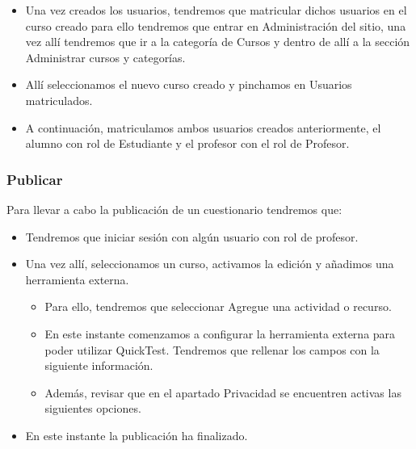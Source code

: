 \begin{itemize}
	\item Una vez creados los usuarios, tendremos que matricular dichos usuarios en el curso creado para ello tendremos que entrar en Administración del sitio, una vez allí tendremos que ir a la categoría de Cursos y dentro de allí a la sección Administrar cursos y categorías.
	
	\item Allí seleccionamos el nuevo curso creado y pinchamos en Usuarios matriculados.
	
	\item A continuación, matriculamos ambos usuarios creados anteriormente, el alumno con rol de Estudiante y el profesor con el rol de Profesor.
	
	

\end{itemize}

\subsubsection{Publicar}

Para llevar a cabo la publicación de un cuestionario tendremos que:

\begin{itemize}

	\item Tendremos que iniciar sesión con algún usuario con rol de profesor.
	
	\item Una vez allí, seleccionamos un curso, activamos la edición y añadimos una herramienta externa.
	
	\begin{itemize}
	
			\item Para ello, tendremos que seleccionar Agregue una actividad o recurso. 
			\item En este instante comenzamos a configurar la herramienta externa para poder utilizar QuickTest. Tendremos que rellenar los campos con la siguiente información. 
			
			\item Además, revisar que en el apartado Privacidad se encuentren activas las siguientes opciones. 
	
	\end{itemize}
	
	\item En este instante la publicación ha finalizado.

\end{itemize}

